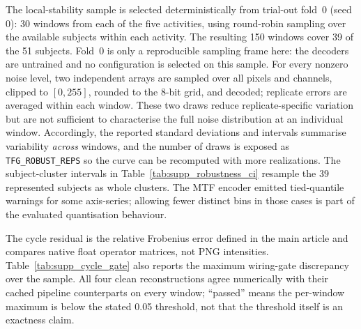 \documentclass[10pt,a4paper,parskip=half-]{scrartcl}
\begin{document}
The local-stability sample is selected deterministically from trial-out fold~0 (seed 0): 30 windows from each of the five activities, using round-robin sampling over the available subjects within each activity. The resulting 150 windows cover 39 of the 51 subjects. Fold~0 is only a reproducible sampling frame here: the decoders are untrained and no configuration is selected on this sample. For every nonzero noise level, two independent arrays are sampled over all pixels and channels, clipped to $[0,255]$, rounded to the 8-bit grid, and decoded; replicate errors are averaged within each window. These two draws reduce replicate-specific variation but are not sufficient to characterise the full noise distribution at an individual window. Accordingly, the reported standard deviations and intervals summarise variability \emph{across} windows, and the number of draws is exposed as \texttt{TFG\_ROBUST\_REPS} so the curve can be recomputed with more realizations. The subject-cluster intervals in Table~\ref{tab:supp_robustness_ci} resample the 39 represented subjects as whole clusters. The MTF encoder emitted tied-quantile warnings for some axis-series; allowing fewer distinct bins in those cases is part of the evaluated quantisation behaviour.

\begin{table}[H]
\centering
\caption{Subject-cluster bootstrap 95\% intervals for mean NMAE along the perturbation curves ($10^4$ resamples). These accompany the between-window standard deviations in the main article.}
\label{tab:supp_robustness_ci}
\small
{}
\end{table}

The cycle residual is the relative Frobenius error defined in the main article and compares native float operator matrices, not PNG intensities. Table~\ref{tab:supp_cycle_gate} also reports the maximum wiring-gate discrepancy over the sample. All four clean reconstructions agree numerically with their cached pipeline counterparts on every window; ``passed'' means the per-window maximum is below the stated 0.05 threshold, not that the threshold itself is an exactness claim.
\end{document}
